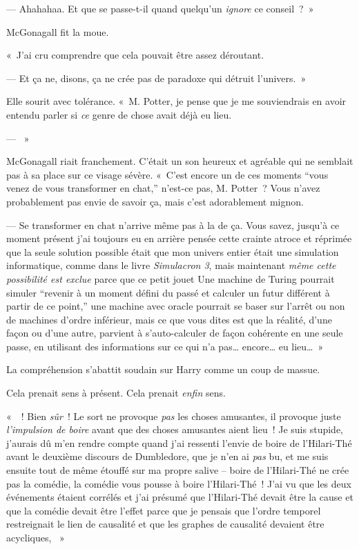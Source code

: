 --- Ahahahaa. Et que se passe-t-il quand quelqu'un \emph{ignore} ce conseil~?~»

McGonagall fit la moue.

«~J'ai cru comprendre que cela pouvait être assez déroutant.

--- Et ça ne, disons, ça ne crée pas de paradoxe qui détruit l'univers.~»

Elle sourit avec tolérance.
«~M. Potter, je pense que je me souviendrais en avoir entendu parler si \emph{ce} genre de chose avait déjà eu lieu.

--- ~»

McGonagall riait franchement.
C'était un son heureux et agréable qui ne semblait pas à sa place sur ce visage sévère.
«~C'est encore un de ces moments “vous venez de vous transformer en chat,” n'est-ce pas, M. Potter~?
Vous n'avez probablement pas envie de savoir ça, mais c'est adorablement mignon.

--- Se transformer en chat n'arrive même pas à la  de ça.
Vous savez, jusqu'à ce moment présent j'ai toujours eu en arrière pensée cette crainte atroce et réprimée que la seule solution possible était que mon univers entier était une simulation informatique, comme dans le livre \emph{Simulacron 3}, mais maintenant \emph{même cette possibilité est exclue} parce que ce petit jouet 
Une machine de Turing pourrait simuler “revenir à un moment défini du passé et calculer un futur différent à partir de ce point,” une machine avec oracle pourrait se baser sur l'arrêt ou non de machines d'ordre inférieur, mais ce que vous dites est que la réalité, d'une façon ou d'une autre, parvient à s'auto-calculer de façon cohérente en une seule passe, en utilisant des informations sur ce qui n'a pas… encore… eu lieu…~»

La compréhension s'abattit soudain sur Harry comme un coup de massue.

Cela prenait sens à présent. Cela prenait \emph{enfin} sens.

«~~!
Bien \emph{sûr}~!
Le sort ne provoque \emph{pas} les choses amusantes, il provoque juste \emph{l'impulsion de boire} avant que des choses amusantes aient lieu~!
Je suis stupide, j'aurais dû m'en rendre compte quand j'ai ressenti l'envie de boire de l'Hilari-Thé avant le deuxième discours de Dumbledore, que je n'en ai \emph{pas} bu, et me suis ensuite tout de même étouffé sur ma propre salive -- boire de l'Hilari-Thé ne crée pas la comédie, la comédie vous pousse à boire l'Hilari-Thé~!
J'ai vu que les deux événements étaient corrélés et j'ai présumé que l'Hilari-Thé devait être la cause et que la comédie devait être l'effet parce que je pensais que l'ordre temporel restreignait le lien de causalité et que les graphes de causalité devaient être acycliques, ~»



